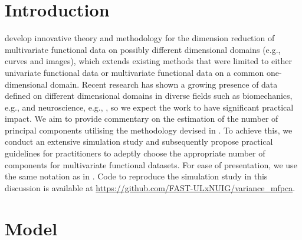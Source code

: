
\section{Introduction} %
\label{sec:introduction}

\cite{happMultivariateFunctionalPrincipal2018} develop innovative theory and methodology for the dimension reduction of multivariate functional data on possibly different dimensional domains (e.g., curves and images), which extends existing methods that were limited to either univariate functional data or multivariate functional data on a common one-dimensional domain. Recent research has shown a growing presence of data defined on different dimensional domains in diverse fields such as biomechanics, e.g., \cite{warmenhovenBivariateFunctionalPrincipal2019} and neuroscience, e.g., \cite{songSparseMultivariateFunctional2022}, so we expect the work to have significant practical impact. We aim to provide commentary on the estimation of the number of principal components utilising the methodology devised in \cite{happMultivariateFunctionalPrincipal2018}. To achieve this, we conduct an extensive simulation study and subsequently propose practical guidelines for practitioners to adeptly choose the appropriate number of components for multivariate functional datasets. For ease of presentation, we use the same notation as in \cite{happMultivariateFunctionalPrincipal2018}. Code to reproduce the simulation study in this discussion is available at \url{https://github.com/FAST-ULxNUIG/variance_mfpca}.


\section{Model} %
\label{sec:model}

